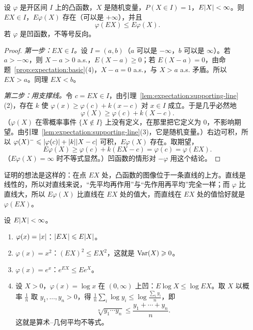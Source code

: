 \begin{theorem}\label{thm:expectation:jensen}
设 $\varphi$ 是开区间 $I$ 上的凸函数，$X$ 是随机变量，$P(X\in I)=1$，$E\lvert X\rvert<\infty$。则 $EX\in I$，$E\varphi(X)$ 存在（可以是 $+\infty$），并且
\[
\varphi(EX)\leqslant E\varphi(X).
\]
若 $\varphi$ 是凹函数，不等号反向。
\end{theorem}
\begin{proof}
\emph{第一步：$EX\in I$。}设 $I=(a,b)$（$a$ 可以是 $-\infty$，$b$ 可以是 $\infty$）。若 $a>-\infty$，则 $X-a>0$ a.s.，$E(X-a)\geqslant0$；若 $E(X-a)=0$，由命题~\ref{prop:expectation:basic}(4)，$X-a=0$ a.s.，与 $X>a$ a.s. 矛盾。所以 $EX>a$。同理 $EX<b$。

\emph{第二步：用支撑线。}令 $c=EX\in I$，由引理~\ref{lem:expectation:supporting-line}(2)，存在 $k$ 使 $\varphi(x)\geqslant\varphi(c)+k(x-c)$ 对 $x\in I$ 成立。于是几乎必然地
\[
\varphi(X)\geqslant\varphi(c)+k(X-c).
\]
（$\varphi(X)$ 在零概率事件 $\{X\notin I\}$ 上没有定义，在那里把它定义为 $0$，不影响期望。由引理~\ref{lem:expectation:supporting-line}(3)，它是随机变量。）右边可积，所以 $\varphi(X)^-\leqslant\lvert \varphi(c)\rvert+\lvert k\rvert\lvert X-c\rvert$ 可积，$E\varphi(X)$ 存在。取期望，
\[
E\varphi(X)\geqslant\varphi(c)+k(EX-c)=\varphi(c)=\varphi(EX).
\]
（$E\varphi(X)=\infty$ 时不等式显然。）凹函数的情形对 $-\varphi$ 用这个结论。
\end{proof}

\begin{remark}
证明的想法是这样的：在点 $EX$ 处，凸函数的图像位于一条直线的上方。直线是线性的，所以对直线来说，“先平均再作用”与“先作用再平均”完全一样；而 $\varphi$ 比直线大，所以 $E\varphi(X)$ 比直线在 $EX$ 处的值大，而直线在 $EX$ 处的值恰好就是 $\varphi(EX)$。
\end{remark}

\begin{example}\label{ex:expectation:jensen}
设 $E\lvert X\rvert<\infty$。
\begin{enumerate}
\item $\varphi(x)=\lvert x\rvert$：$\lvert EX\rvert\leqslant E\lvert X\rvert$。
\item $\varphi(x)=x^2$：$(EX)^2\leqslant EX^2$，这就是 $\operatorname{Var}(X)\geqslant0$。
\item $\varphi(x)=e^x$：$e^{EX}\leqslant Ee^X$。
\item 设 $X>0$，$\varphi(x)=\log x$ 在 $(0,\infty)$ 上凹：$E\log X\leqslant\log EX$。取 $X$ 以概率 $\frac1n$ 取 $y_1,\dots,y_n>0$，得 $\frac1n\sum_i\log y_i\leqslant\log\frac{\sum_iy_i}n$，即
\[
\sqrt[n]{y_1\cdots y_n}\leqslant\frac{y_1+\cdots+y_n}n .
\]
这就是算术--几何平均不等式。
\end{enumerate}
\end{example}

